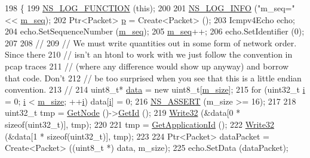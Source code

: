 \begin{DoxyCode}
198 \{
199   \hyperlink{log-macros-disabled_8h_a90b90d5bad1f39cb1b64923ea94c0761}{NS\_LOG\_FUNCTION} (\textcolor{keyword}{this});
200 
201   \hyperlink{group__logging_gafbd73ee2cf9f26b319f49086d8e860fb}{NS\_LOG\_INFO} (\textcolor{stringliteral}{"m\_seq="} << \hyperlink{classns3_1_1V4Ping_a6575afe89682fff8b490075425d8157e}{m\_seq});
202   Ptr<Packet> \hyperlink{lte__link__budget_8m_ac9de518908a968428863f829398a4e62}{p} = Create<Packet> ();
203   Icmpv4Echo echo;
204   echo.SetSequenceNumber (\hyperlink{classns3_1_1V4Ping_a6575afe89682fff8b490075425d8157e}{m\_seq});
205   \hyperlink{classns3_1_1V4Ping_a6575afe89682fff8b490075425d8157e}{m\_seq}++;
206   echo.SetIdentifier (0);
207 
208   \textcolor{comment}{//}
209   \textcolor{comment}{// We must write quantities out in some form of network order.  Since there}
210   \textcolor{comment}{// isn't an htonl to work with we just follow the convention in pcap traces}
211   \textcolor{comment}{// (where any difference would show up anyway) and borrow that code.  Don't}
212   \textcolor{comment}{// be too surprised when you see that this is a little endian convention.}
213   \textcolor{comment}{//}
214   uint8\_t* \hyperlink{topology-example-sim_8cc_a26c65296e316af77b787dc77469bb2a4}{data} = \textcolor{keyword}{new} uint8\_t[\hyperlink{classns3_1_1V4Ping_a15214114a8580f6e7c56ad18267b2199}{m\_size}];
215   \textcolor{keywordflow}{for} (uint32\_t \hyperlink{bernuolliDistribution_8m_a6f6ccfcf58b31cb6412107d9d5281426}{i} = 0; \hyperlink{bernuolliDistribution_8m_a6f6ccfcf58b31cb6412107d9d5281426}{i} < \hyperlink{classns3_1_1V4Ping_a15214114a8580f6e7c56ad18267b2199}{m\_size}; ++\hyperlink{bernuolliDistribution_8m_a6f6ccfcf58b31cb6412107d9d5281426}{i}) data[\hyperlink{bernuolliDistribution_8m_a6f6ccfcf58b31cb6412107d9d5281426}{i}] = 0;
216   \hyperlink{assert_8h_a6dccdb0de9b252f60088ce281c49d052}{NS\_ASSERT} (m\_size >= 16);
217 
218   uint32\_t tmp = \hyperlink{classns3_1_1Application_a664b15088389bec8e35b35742138f097}{GetNode} ()->\hyperlink{classns3_1_1Node_aaf49b64a843565ce3812326313b370ac}{GetId} ();
219   \hyperlink{classns3_1_1V4Ping_a788f340b5a054f7fb2c7fc3206ee6d7f}{Write32} (&data[0 * \textcolor{keyword}{sizeof}(uint32\_t)], tmp);
220 
221   tmp = \hyperlink{classns3_1_1V4Ping_a294b811c91221c31618d4cdcb389a96b}{GetApplicationId} ();
222   \hyperlink{classns3_1_1V4Ping_a788f340b5a054f7fb2c7fc3206ee6d7f}{Write32} (&data[1 * \textcolor{keyword}{sizeof}(uint32\_t)], tmp);
223 
224   Ptr<Packet> dataPacket = Create<Packet> ((uint8\_t *) data, m\_size);
225   echo.SetData (dataPacket);

\end{DoxyCode}
